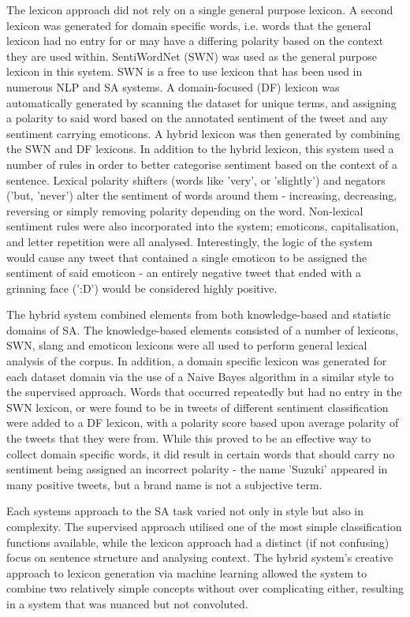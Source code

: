 The lexicon approach did not rely on a single general purpose lexicon. A
second lexicon was generated for domain specific words, i.e. words that the
general lexicon had no entry for or may have a differing polarity based on the
context they are used within.
SentiWordNet (SWN) was used as the general purpose lexicon in this system.
SWN is a free to use lexicon that has been used in numerous NLP and SA
systems.
A domain-focused (DF) lexicon was automatically generated by scanning the
dataset for unique terms, and assigning a polarity to said word based on the
annotated sentiment of the tweet and any sentiment carrying emoticons.
A hybrid lexicon was then generated by combining the SWN and DF lexicons.
In addition to the hybrid lexicon, this system  used a number of rules in
order to better categorise sentiment based on the context of a sentence.
Lexical polarity shifters (words like 'very', or 'slightly') and negators
('but, 'never') alter the sentiment of words around them - increasing,
decreasing, reversing or simply removing polarity depending on the word.
Non-lexical sentiment rules were also incorporated into the system;
emoticons, capitalisation, and letter repetition were all analysed.
Interestingly, the logic of the system would cause any tweet that contained a
single emoticon to be assigned the sentiment of said emoticon - an entirely
negative tweet that ended with a grinning face (':D') would be considered highly
positive.

The hybrid system combined elements from both knowledge-based and statistic
domains of SA.
The knowledge-based elements consisted of a number of lexicons, SWN, slang and
emoticon lexicons were all used to perform general lexical analysis of the
corpus.
In addition, a domain specific lexicon was generated for each dataset domain
via the use of a Naive Bayes algorithm in a similar style to the supervised
approach.
Words that occurred repeatedly but had no entry in the SWN lexicon, or were
found to be in tweets of different sentiment classification were added to a
DF lexicon, with a polarity score based upon average polarity of the tweets
that they were from.
While this proved to be an effective way to collect domain specific words,
it did result in certain words that should carry no sentiment being assigned
an incorrect polarity - the name 'Suzuki' appeared in many positive tweets, but
a brand name is not a subjective term.

Each systems approach to the SA task varied not only in style but also in
complexity.
The supervised approach utilised one of the most simple classification
functions available, while the lexicon approach had a distinct (if not confusing) focus on sentence structure and analysing context.
The hybrid system's creative approach to lexicon generation via machine
learning allowed the system to combine two relatively simple concepts without
over complicating either, resulting in a system that was nuanced but not convoluted.

